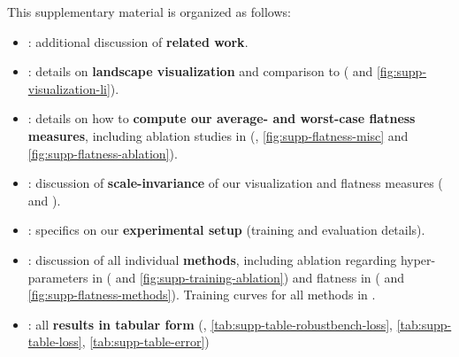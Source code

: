 This supplementary material is organized as follows:
\begin{itemize}
	\item {}: additional discussion of \textbf{related work}.
	\item {}: details on \textbf{\RCE landscape visualization} and comparison to \cite{LiNIPS2018} (\cf {} and \ref{fig:supp-visualization-li}).
	\item {}: details on how to \textbf{compute our average- and worst-case flatness measures}, including ablation studies in  (\cf {}, \ref{fig:supp-flatness-misc} and \ref{fig:supp-flatness-ablation}).
	\item {}: discussion of \textbf{scale-invariance} of our visualization and flatness measures (\cf {} and ).
	\item {}: specifics on our \textbf{experimental setup} (training and evaluation details).
	\item {}: discussion of all individual \textbf{methods}, including ablation regarding hyper-parameters in  (\cf {} and \ref{fig:supp-training-ablation}) and flatness in  (\cf {} and \ref{fig:supp-flatness-methods}). Training curves for all methods in .
	\item {}: all \textbf{results in tabular form} (, \ref{tab:supp-table-robustbench-loss}, \ref{tab:supp-table-loss}, \ref{tab:supp-table-error})
\end{itemize}